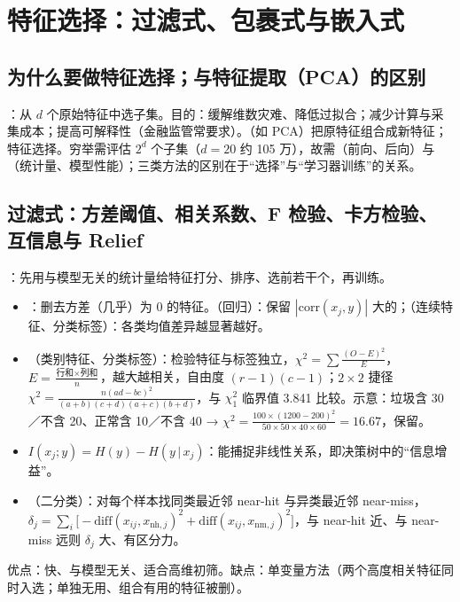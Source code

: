 \section{特征选择：过滤式、包裹式与嵌入式}

\subsection{为什么要做特征选择；与特征提取（PCA）的区别}
：从 $d$ 个原始特征中选子集。目的：缓解维数灾难、降低过拟合；减少计算与采集成本；提高可解释性（金融监管常要求）。（如 PCA）把原特征组合成新特征；特征选择。穷举需评估 $2^d$ 个子集（$d=20$ 约 105 万），故需（前向、后向）与（统计量、模型性能）；三类方法的区别在于“选择”与“学习器训练”的关系。

\subsection{过滤式：方差阈值、相关系数、F 检验、卡方检验、互信息与 Relief}
：先用与模型无关的统计量给特征打分、排序、选前若干个，再训练。
\begin{itemize}
\item {}：删去方差（几乎）为 0 的特征。（回归）：保留 $|\mathrm{corr}(x_j,y)|$ 大的；（连续特征、分类标签）：各类均值差异越显著越好。
\item {}（类别特征、分类标签）：检验特征与标签独立，$\chi^2=\sum\frac{(O-E)^2}{E}$，$E=\frac{\text{行和}\times\text{列和}}{n}$，越大越相关，自由度 $(r-1)(c-1)$；$2\times2$ 捷径 $\chi^2=\frac{n(ad-bc)^2}{(a+b)(c+d)(a+c)(b+d)}$，与 $\chi^2_1$ 临界值 3.841 比较。示意：垃圾含 30／不含 20、正常含 10／不含 40 → $\chi^2=\frac{100\times(1200-200)^2}{50\times50\times40\times60}=16.67$，保留。
\item {} $I(x_j;y)=H(y)-H(y\,|\,x_j)$：能捕捉非线性关系，即决策树中的“信息增益”。
\item {}（二分类）：对每个样本找同类最近邻 near-hit 与异类最近邻 near-miss，$\delta_j=\sum_i\big[-\mathrm{diff}(x_{ij},x_{\text{nh},j})^2+\mathrm{diff}(x_{ij},x_{\text{nm},j})^2\big]$，与 near-hit 近、与 near-miss 远则 $\delta_j$ 大、有区分力。
\end{itemize}
优点：快、与模型无关、适合高维初筛。缺点：单变量方法（两个高度相关特征同时入选；单独无用、组合有用的特征被删）。

